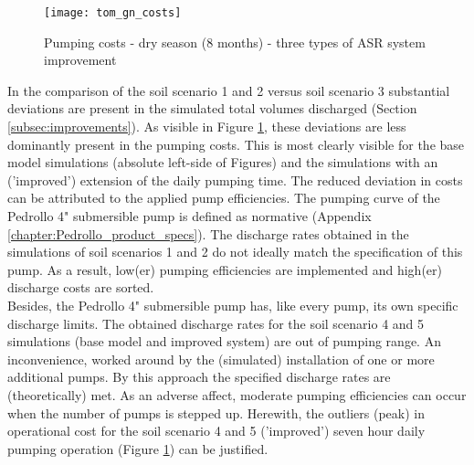 \begin{figure}[h!]
 \centering
 \texttt{[image: tom\_gn\_costs]}
 \captionsetup{justification=centering} 
 \caption{Pumping costs - dry season (8 months) - three types of ASR system improvement}
 \label{fig:tom_gn_yield}
\end{figure}

In the comparison of the soil scenario 1 and 2 versus soil scenario 3 substantial deviations are present in the simulated total volumes discharged (Section \ref{subsec:improvements}). As visible in Figure \ref{fig:tom_gn_yield}, these deviations are less dominantly present in the pumping costs. This is most clearly visible for the base model simulations (absolute left-side of Figures) and the simulations with an ('improved') extension of the daily pumping time. The reduced deviation in costs can be attributed to the applied pump efficiencies. The pumping curve of the Pedrollo 4" submersible pump is defined as normative (Appendix \ref{chapter:Pedrollo_product_specs}). The discharge rates obtained in the simulations of soil scenarios 1 and 2 do not ideally match the specification of this pump. As a result, low(er) pumping efficiencies are implemented and high(er) discharge costs are sorted. \\


Besides, the Pedrollo 4" submersible pump has, like every pump, its own specific discharge limits. The obtained discharge rates for the soil scenario 4 and 5 simulations (base model and improved system) are out of pumping range. An inconvenience, worked around by the (simulated) installation of one or more additional pumps. By this approach the specified discharge rates are (theoretically) met. As an adverse affect, moderate pumping efficiencies can occur when the number of pumps is stepped up. Herewith, the outliers (peak) in operational cost for the soil scenario 4 and 5 ('improved') seven hour daily pumping operation (Figure \ref{fig:tom_gn_yield}) can be justified. \\  



